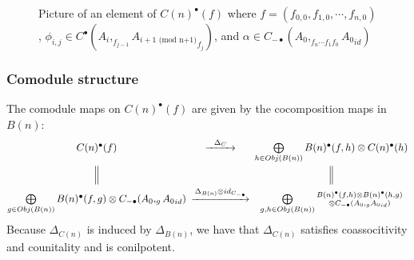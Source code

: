 \begin{figure}
\centerline{}
\caption{Picture of an element of $C(n)^\bullet(f)$ 
where $f = (f_{0,0}, f_{1,0}, \cdots, f_{n,0})$, 
$\phi_{i,j} \in C^\bullet(A_i, _{f_{j-1}}
{A_{i+1 \textrm{ (mod n+1)}}}_{f_j})$, and 
$\alpha \in C_{-\bullet}(A_0, _{f_n\cdots f_1 f_0}
{A_0}_{id})$}
 \label{fig:phi|alpha}
\end{figure}
%
\subsubsection{Comodule structure}\label{sec:comod_strre}
The comodule maps on $C(n)^\bullet(f)$ are given by the
cocomposition maps in $B(n)$: 
%
\begin{equation*}
\begin{CD}
C(n)^\bullet(f) @>\Delta_C>>
\bigoplus\limits_{h \in Obj(B(n))} B(n)^\bullet(f,h) \otimes C(n)^\bullet(h) \\
@|  @| \\
\bigoplus\limits_{g \in Obj(B(n))} B(n)^\bullet(f,g) \otimes C_{-\bullet}(A_0, _g{A_0}_{id})
@>\Delta_{B(n)}\otimes id_{C_{-\bullet}}>>
\bigoplus\limits_{g,h\in Obj(B(n))} \substack{B(n)^\bullet(f,h)\otimes B(n)^\bullet(h,g) \\ \otimes 
C_{-\bullet}(A_0, _g{A_0}_{id})}
\end{CD} 
\end{equation*}
%
Because $\Delta_{C(n)}$ is induced by 
$\Delta_{B(n)}$, we have that $\Delta_{C(n)}$ 
satisfies coassocitivity and counitality 
and is conilpotent. 

